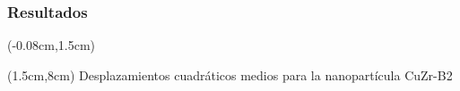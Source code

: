 \begin{frame}
 \frametitle{Resultados}
 
 \begin{textblock*}{12.6cm}(-0.08cm,1.5cm) 
      \begin{figure}[htp]
	\centering
      \end{figure}
    \end{textblock*}
    \begin{textblock*}{10cm}(1.5cm,8cm) 
    \centering
      Desplazamientos cuadráticos medios para la nanopartícula CuZr-B2
 \end{textblock*}
\end{frame}

